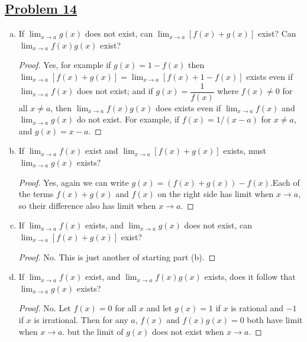 \documentclass[10pt,letterpaper]{article}
\begin{document}
	\subsection*{{\color{purple}\underline{Problem 14}}}
	\begin{enumerate}[(a)]
		\item If $\displaystyle\lim_{x\to a}g(x)$ does not exist, can $\displaystyle\lim_{x\to a}[f(x) + g(x)]$
		exist? Can $\displaystyle\lim_{x\to a}f(x)g(x)$ exist?
		\begin{proof}
		Yes, for example if $g(x) = 1 - f(x)$ then $\displaystyle\lim_{x\to a}[f(x) + g(x)] = 
		\displaystyle\lim_{x\to a}[f(x) + 1 - f(x)]$ exists even if $\displaystyle\lim_{x\to a}f(x)$
		does not exist; and if $g(x) = \dfrac{1}{f(x)}$ where $f(x) \neq 0$ for all $x \neq a$, then
		$\displaystyle\lim_{x\to a}f(x)g(x)$ does exists even if $\displaystyle\lim_{x\to a}f(x)$
		and $\displaystyle\lim_{x\to a}g(x)$ do not exist. For example, if $f(x) = 1/(x - a)$ for $x \neq a$,
		and $g(x) = x - a$.
		\end{proof}
		
		\item If $\displaystyle\lim_{x\to a}f(x)$ exist and $\displaystyle\lim_{x\to a}[f(x) + g(x)]$ exists,
		must $\displaystyle\lim_{x\to a}g(x)$ exists?
		\begin{proof}
			Yes, again we can write $g(x) = (f(x) + g(x)) - f(x)$.Each of the terms $f(x) + g(x)$
			and $f(x)$ on the right side has limit when $x \rightarrow a$,
			so their difference also has limit when $x \rightarrow a$.
		\end{proof}
		
		\item If $\displaystyle\lim_{x\to a}f(x)$ exists, and $\displaystyle\lim_{x\to a}g(x)$ does not exist,
		can $\displaystyle\lim_{x\to a}[f(x) + g(x)]$ exist?
		\begin{proof}
			No. This is just another of starting part (b).
		\end{proof}
		
		\item If $\displaystyle\lim_{x\to a}f(x)$ exist, and $\displaystyle\lim_{x\to a}f(x)g(x)$ exists,
		does it follow that $\displaystyle\lim_{x\to a}g(x)$ exists?	
		\begin{proof}
			No. Let $f(x) = 0$ for all $x$ and let $g(x) = 1$ if $x$ is rational and $-1$ if $x$
			is irrational. Then for any $a$, $f(x)$ and $f(x)g(x) = 0$ both have limit when $x \rightarrow a$.
			but the limit of $g(x)$ does not exist when $x \rightarrow a$.
		\end{proof}
	\end{enumerate}
	
\end{document}
